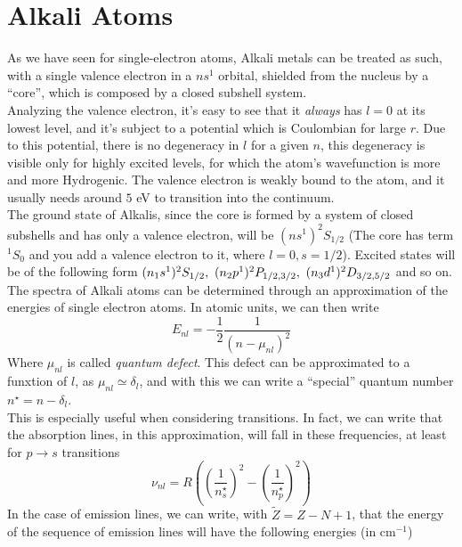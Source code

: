 \documentclass[../qm.tex]{subfiles}
\begin{document}
	\section{Alkali Atoms}
	As we have seen for single-electron atoms, Alkali metals can be treated as such, with a single valence electron in a $ns^1$ orbital, shielded from the nucleus by a ``core'', which is composed by a closed subshell system.\\
	Analyzing the valence electron, it's easy to see that it \emph{always} has $l=0$ at its lowest level, and it's subject to a potential which is Coulombian for large $r$. Due to this potential, there is no degeneracy in $l$ for a given $n$, this degeneracy is visible only for highly excited levels, for which the atom's wavefunction is more and more Hydrogenic. The valence electron is weakly bound to the atom, and it usually needs around $5$ eV to transition into the continuum.\\
	The ground state of Alkalis, since the core is formed by a system of closed subshells and has only a valence electron, will be $(ns^1) ^2S_{1/2}$ (The core has term $^1S_0$ and you add a valence electron to it, where $l=0,s=1/2$). Excited states will be of the following form $(n_1s^1)^2S_{1/2},\ (n_2p^1)\term[1/2,3/2]{P}{2},\ (n_3d^1)\term[3/2,5/2]{D}{2}$ and so on.\\
	The spectra of Alkali atoms can be determined through an approximation of the energies of single electron atoms. In atomic units, we can then write
	\begin{equation}
		E_{nl}=-\frac{1}{2}\frac{1}{(n-\mu_{nl})^2}
		\label{eq:quantumdef}
	\end{equation}
	Where $\mu_{nl}$ is called \textit{quantum defect}. This defect can be approximated to a funxtion of $l$, as $\mu_{nl}\simeq\delta_l$, and with this we can write a ``special'' quantum number $n^{\star}=n-\delta_l$.\\
	This is especially useful when considering transitions. In fact, we can write that the absorption lines, in this approximation, will fall in these frequencies, at least for $p\to s$ transitions
	\begin{equation}
		\nu_{nl}=R\left( \left( \frac{1}{n^{\star}_{s}} \right)^2-\left( \frac{1}{n^{\star}_{p}} \right)^2 \right)
		\label{eq:ptostransitionsapprox}
	\end{equation}
	In the case of emission lines, we can write, with $\tilde{Z}=Z-N+1$, that the energy of the sequence of emission lines will have the following energies (in $\mathrm{cm^{-1}}$)
\end{document}
